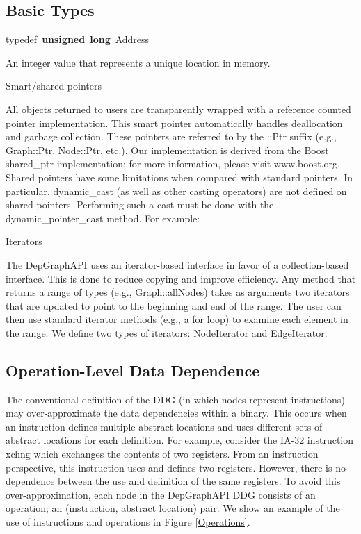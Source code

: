 \documentclass[12pt]{article}
\begin{document}
\subsection{Basic Types}

{\ttfamily \raggedright \small
typedef\ \textbf{unsigned}\ \textbf{long}\ Address\\
 }
\normalfont\normalsize
\indent An integer value that represents a unique location in memory.

\noindent Smart/shared pointers

All objects returned to users are transparently wrapped with a
reference counted pointer implementation. This smart pointer
automatically handles deallocation and garbage collection. These
pointers are referred to by the ::Ptr suffix (e.g., Graph::Ptr,
Node::Ptr, etc.). Our implementation is derived from the Boost
shared\_ptr implementation; for more information, please visit
www.boost.org. Shared pointers have some limitations when compared
with standard pointers. In particular, dynamic\_cast (as well as other
casting operators) are not defined on shared pointers. Performing such
a cast must be done with the dynamic\_pointer\_cast method. For example:

\normalfont\normalsize

\noindent Iterators 

The DepGraphAPI uses an iterator-based interface in favor of a
collection-based interface. This is done to reduce copying and improve
efficiency. Any method that returns a range of types (e.g.,
Graph::allNodes) takes as arguments two iterators that are updated to
point to the beginning and end of the range. The user can then use
standard iterator methods (e.g., a for loop) to examine each element
in the range. We define two types of iterators: NodeIterator and
EdgeIterator.

\subsection{Operation-Level Data Dependence}

The conventional definition of the DDG (in which nodes represent
instructions) may over-approximate the data dependencies within a
binary. This occurs when an instruction defines multiple abstract
locations and uses different sets of abstract locations for each
definition. For example, consider the IA-32 instruction xchng which
exchanges the contents of two registers. From an instruction
perspective, this instruction uses and defines two registers. However,
there is no dependence between the use and definition of the same
registers. To avoid this over-approximation, each node in the
DepGraphAPI DDG consists of an operation; an (instruction, abstract
location) pair. We show an example of the use of instructions and
operations in Figure \ref{Operations}.
\end{document}
